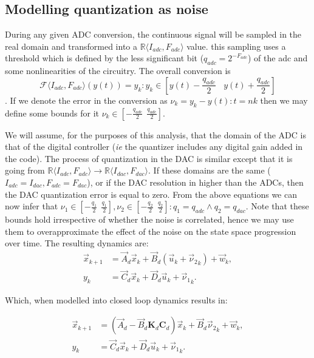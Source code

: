 \documentclass[runningheads,a4paper]{llncs}
\newcommand{\mat}[1]{\boldsymbol{#1}}
\begin{document}
\subsection{Modelling quantization as noise}

During any given ADC conversion, the continuous signal will be sampled in the real domain and transformed into a $\mathbb{R}\langle I_{adc},F_{adc} \rangle$ value. this sampling uses a threshold which is defined by the less significant bit ($q_{adc}=2^{-F_{adc}}$) of the adc and some nonlinearities of the circuitry. The overall conversion is
$$\mathcal{F}\langle I_{adc},F_{adc} \rangle(y(t)) = y_k : y_k \in \left[y(t)-\frac{q_{adc}}{2}\ \ \ \ y(t)+\frac{q_{adc}}{2}\right]$$.
If we denote the error in the conversion as $\nu_k=y_k-y(t) : t=nk$ then we may define some bounds for it $\nu_k \in [-\frac{q_{adc}}{2}\ \ \frac{q_{adc}}{2}]$.

We will assume, for the purposes of this analysis, that the domain of the ADC is that of the digital controller (\emph{ie} the quantizer includes any digital gain added in the code).
The process of quantization in the DAC is similar except that it is going from $\mathbb{R}\langle I_{adc},F_{adc} \rangle \rightarrow \mathbb{R}\langle I_{dac},F_{dac} \rangle$. If these domains are the same ($I_{adc}=I_{dac},F_{adc}=F_{dac}$), or if the DAC resolution in higher than the ADCs, then the DAC quantization error is equal to zero.
From the above equations we can now infer that $\nu_1 \in [-\frac{q_1}{2}\ \ \frac{q_1}{2}], \nu_2 \in [-\frac{q_2}{2}\ \ \frac{q_2}{2}] : q_1=q_{adc} \wedge q_2=q_{dac}$.
Note that these bounds hold irrespective of whether the noise is correlated, hence we may use them to overapproximate the effect of the noise on the state space progression over time.
The resulting dynamics are:
\begin{align}
\label{eq:pre_quantization}
\vec{x}_{k+1} &= \vec{A}_d\vec{x}_k+\vec{B}_d(\vec{u}_k+{\vec{\nu}_2}_k) + \vec{w}_k,\\
y_k &= \vec{C}_d \vec{x}_ k + \vec{D}_d \vec{u}_ k+{\vec{\nu}_1}_k. 
\end{align}

Which, when modelled into closed loop dynamics results in:

\begin{align}
\label{eq:quantization}
\vec{x}_{k+1} &= (\vec{A}_d-\vec{B}_d\mat{K}_d\mat{C}_d) \vec{x}_k+\vec{B}_d{\vec{\nu}_2}_k + \vec{w}_k,\\
y_k &= \vec{C}_d \vec{x}_ k + \vec{D}_d \vec{u}_ k+{\vec{\nu}_1}_k. 
\end{align}
\end{document}
